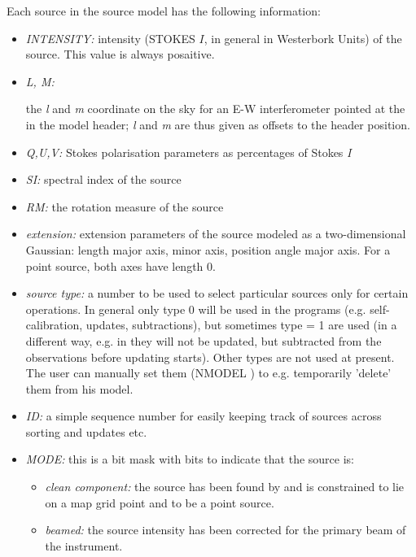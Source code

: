 	Each source in the source model has the following information:
\begin{itemize}

\item	{\em INTENSITY:}
	intensity (STOKES $I$, in general in Westerbork Units) of the
source.  This value is always posaitive. 

\item	{\em L, M:}	\label{.lm}
 	
	the {\em l} and {\em m} coordinate on the sky for an E-W
interferometer pointed at the 
in the model header; {\em l} and {\em m} are
thus given as offsets to the header position. 

\item	{\em Q,U,V:}
	Stokes polarisation parameters as percentages of Stokes {\em I}

\item	{\em SI:}
	spectral index of the source

\item	{\em RM:}
	the rotation measure of the source

\item	{\em extension:}
	extension parameters of the source modeled as a two-dimensional
Gaussian: length major axis, minor axis, position angle major axis.  For
a point source, both axes have length 0. 


\item	{\em source type:}	\label{.type}
	a number to be used to select particular sources only for
certain operations.  In general only type 0 will be used in the programs
(e.g.  self-calibration, updates, subtractions), but sometimes type = 1
are used (in a different way, e.g.  in
 they will not be updated, but
subtracted from the observations before updating starts).  Other types
are not used at present.  The user can manually set them (NMODEL
) to e.g.  temporarily 'delete' them
from his model. 

\item	{\em ID:}
	a simple sequence number for easily keeping track of sources
across sorting and updates etc. 

\item	{\em MODE:}
	this is a bit mask with bits to indicate that the source is:
%
	\begin{itemize}
	\item	{\em clean component:}
	the source has been found by  and
is constrained to lie on a map grid point and to be a point source. 

	\item	{\em beamed:}	\label{.beamed}	 
	the source intensity has been corrected for the primary beam of
the instrument. 
	\end{itemize}
\end{itemize}

